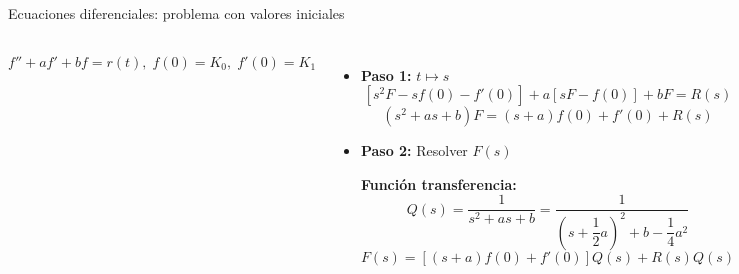 \documentclass[9pt, aspectratio=169]{beamer}
\begin{document}
\begin{frame}{Ecuaciones diferenciales: problema con valores iniciales}
	\begin{columns}[t]
		\cx
		$f'' + a f' + b f = r(t), \; f(0) = K_0, \; f'(0) = K_1$ \pause

		\begin{itemize}
			\item \textbf{Paso 1:}  $t \mapsto s$
			      \[ [s^2 F - s f(0) - f'(0)] + a[s F - f(0)] + b F = R(s) \]
			      \[ (s^2 + a s + b) F = (s + a) f(0) + f'(0) + R(s) \]
			      \pause

			\item \textbf{Paso 2:} Resolver $F(s)$

			      \textbf{Función transferencia:}
			      \[ Q(s) = \frac{1}{s^2 + a s + b} = \frac{1}{\left(s + \dfrac{1}{2} a \right)^2 + b - \dfrac{1}{4} a^2} \]
			      \[ F(s) = [(s + a) f(0) + f'(0)] Q(s) + R(s) Q(s) \]
		\end{itemize}
		\pause

		\cx
		Si $f(0) = f'(0) = 0$, $F = R Q$:
		\[ Q = \frac{F}{R} = \frac{\mathscr{L}(\text{salida})}{\mathscr{L}(\text{entrada})} \]
		$Q$ no depende de $r$ ni de las condiciones iniciales (solo de $a$ y $b$).
		\pause

		\begin{itemize}
			\item \textbf{Paso 3:} Inversión de $F$
			      \[ f(t) = \mathscr{L}^{-1}(F) \]
		\end{itemize}
	\end{columns}
\end{frame}
\end{document}
